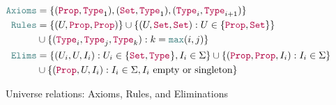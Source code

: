 \begin{figure}
\centering
\begin{align*}
\Axioms
    &= \set{(\Prop, \Type{1}), (\Set, \Type{1}), (\Type{i}, \Type{i+1})} \\
\Rules
    &= \set{(U, \Prop, \Prop)}
    \cup \set{(U, \Set, \Set) : U \in \set{\Prop, \Set}} \\
    &\cup \set{(\Type{i}, \Type{j}, \Type{k}) : k = \meta{max}(i, j)} \\
\Elims
    &= \set{(U_i, U, I_i) : U_i \in \set{\Set, \Type{}}, I_i \in \Sigma}
    \cup \set{(\Prop, \Prop, I_i) : I_i \in \Sigma} \\
    &\cup \set{(\Prop, U, I_i) : I_i \in \Sigma, \text{$I_i$ empty or singleton}}
\end{align*}
\caption{Universe relations: Axioms, Rules, and Eliminations}
\label{fig:axruel}
\end{figure}

